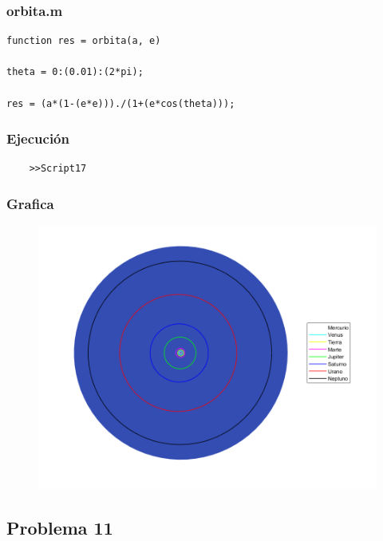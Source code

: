 \documentclass{article}
\begin{document}
	\subsubsection{orbita.m}
	
	\begin{lstlisting}
function res = orbita(a, e)

theta = 0:(0.01):(2*pi);

res = (a*(1-(e*e)))./(1+(e*cos(theta)));
	\end{lstlisting}

	\subsubsection{Ejecución}
	
	\begin{lstlisting}
	>>Script17
	\end{lstlisting}
	
	\subsubsection{Grafica}
	
	\begin{figure}[h]
		\centering
		\includegraphics[width=\textwidth]{grafica17.png}
	\end{figure}
	
	\newpage
	
	\subsection{Problema 11}
	
\end{document}
